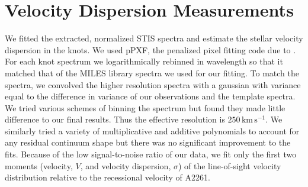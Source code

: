 \documentclass[useAMS,usenatbib]{emulateapj}
\newcommand{\src}{BCG\,2261}
\begin{document}

\section{Velocity Dispersion Measurements}

We fitted the extracted, normalized STIS spectra and estimate the stellar velocity dispersion in the knots.  We used pPXF, the penalized pixel fitting code due to \citet{2004PASP..116..138C}.  
For each knot spectrum we logarithmically rebinned in wavelength so that it matched that of the MILES library spectra \citep{2010MNRAS.404.1639V} we used for our fitting.  To match the spectra, we convolved the higher resolution spectra with a gaussian with variance equal to the difference in variance of our observations and the template spectra.  
We tried various schemes of binning the spectrum but found they made little difference to our final results.  Thus the effective resolution is $250\,\mathrm{km\,s^{-1}}$.    We similarly tried a variety of multiplicative and additive polynomials to account for any residual continuum shape but there was no significant improvement to the fits.  Because of the low signal-to-noise ratio of our data, we fit only the first two moments (velocity, $V$, and velocity dispersion, $\sigma$) of the line-of-sight velocity distribution relative to the recessional velocity of A2261.
\end{document}
